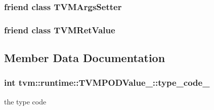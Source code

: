 \subsubsection[{\texorpdfstring{T\+V\+M\+Args\+Setter}{TVMArgsSetter}}]{\setlength{\rightskip}{0pt plus 5cm}friend class {\bf T\+V\+M\+Args\+Setter}\hspace{0.3cm}{\ttfamily [friend]}}\hypertarget{classtvm_1_1runtime_1_1TVMPODValue___a35ae555d4becf356b16aeacd353d41ee}{}\label{classtvm_1_1runtime_1_1TVMPODValue___a35ae555d4becf356b16aeacd353d41ee}
\subsubsection[{\texorpdfstring{T\+V\+M\+Ret\+Value}{TVMRetValue}}]{\setlength{\rightskip}{0pt plus 5cm}friend class {\bf T\+V\+M\+Ret\+Value}\hspace{0.3cm}{\ttfamily [friend]}}\hypertarget{classtvm_1_1runtime_1_1TVMPODValue___ae0ea8b4adc6dab8c74086bceaef6b3e1}{}\label{classtvm_1_1runtime_1_1TVMPODValue___ae0ea8b4adc6dab8c74086bceaef6b3e1}


\subsection{Member Data Documentation}
\subsubsection[{\texorpdfstring{type\+\_\+code\+\_\+}{type_code_}}]{\setlength{\rightskip}{0pt plus 5cm}int tvm\+::runtime\+::\+T\+V\+M\+P\+O\+D\+Value\+\_\+\+::type\+\_\+code\+\_\+\hspace{0.3cm}{\ttfamily [protected]}}\hypertarget{classtvm_1_1runtime_1_1TVMPODValue___aed3e983e990c5c4ed3ac09b95055297e}{}\label{classtvm_1_1runtime_1_1TVMPODValue___aed3e983e990c5c4ed3ac09b95055297e}


the type code 

